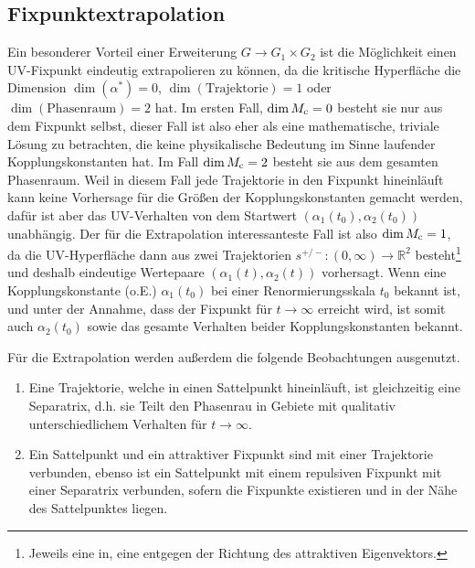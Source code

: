   \subsection{Fixpunktextrapolation}
    Ein besonderer Vorteil einer Erweiterung $G \to G_1\times G_2$ ist die Möglichkeit einen 
    UV-Fixpunkt eindeutig extrapolieren zu können, da die kritische Hyperfläche die Dimension 
    $\dim(\alpha^*)=0$, $\dim(\text{Trajektorie})=1$ oder $\dim(\text{Phasenraum})=2$ hat. Im 
    ersten Fall, $\dim M_\text{c}=0$ besteht sie nur aus dem Fixpunkt selbst, 
    dieser Fall ist also eher als eine mathematische, triviale Lösung zu betrachten, die keine 
    physikalische Bedeutung im Sinne laufender Kopplungskonstanten hat. Im Fall $\dim M_\text{c} =2$ 
    besteht sie aus dem gesamten Phasenraum. Weil in diesem Fall jede Trajektorie in den Fixpunkt 
    hineinläuft 
    kann keine Vorhersage für die Größen der Kopplungskonstanten gemacht werden, dafür ist aber 
    das UV-Verhalten von dem Startwert $\left(\alpha_1(t_0),\alpha_2(t_0)\right)$ unabhängig. 
    Der für die Extrapolation interessanteste Fall ist also $\dim M_\text{c} = 1$, da die UV-Hyperfläche 
    dann aus zwei Trajektorien $s^{+/-}:(0,\infty)\to \mathbb{R}^2$ besteht\footnote{Jeweils 
    eine in, eine entgegen der Richtung des attraktiven Eigenvektors.} und deshalb 
    eindeutige Wertepaare $(\alpha_1(t),\alpha_2(t))$ vorhersagt. Wenn eine Kopplungskonstante 
    (o.E.) $\alpha_1(t_0)$ 
    bei einer Renormierungsskala $t_0$ bekannt ist, und unter der Annahme, dass der Fixpunkt für 
    $t\to\infty$ erreicht wird, ist somit auch $\alpha_2(t_0)$ sowie das gesamte Verhalten beider 
    Kopplungskonstanten bekannt.
    
    Für die Extrapolation werden außerdem die folgende Beobachtungen ausgenutzt.
    \begin{enumerate}
     \item Eine Trajektorie, welche in einen Sattelpunkt hineinläuft, ist gleichzeitig eine 
      Separatrix, d.h. sie Teilt den Phasenrau in Gebiete mit qualitativ unterschiedlichem 
      Verhalten für $t \to \infty$.
     \item Ein Sattelpunkt und ein attraktiver Fixpunkt sind mit einer Trajektorie verbunden, 
      ebenso ist ein Sattelpunkt mit einem repulsiven Fixpunkt mit einer Separatrix verbunden, 
      sofern die Fixpunkte existieren und in der Nähe des Sattelpunktes liegen. 
    \end{enumerate}

